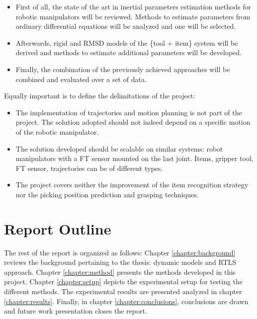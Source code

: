 \documentclass[/home/francois/latex/report/main.tex]{subfiles}
\begin{document}
\begin{itemize}
    \item First of all, the state of the art in inertial parameters estimation methods for robotic manipulators will be reviewed. Methods to estimate parameters from ordinary differential equations will be analyzed and one will be selected.
    \item Afterwards, rigid and \ac{RMSD} models of the \{tool + item\} system will be derived and methods to estimate additional parameters will be developed.
    \item Finally, the combination of the previously achieved approaches will be combined and evaluated over a set of data.
\end{itemize}

Equally important is to define the delimitations of the project:

\begin{itemize}
    \item The implementation of trajectories and motion planning is not part of the project. The solution adopted should not indeed depend on a specific motion of the robotic manipulator.
    \item The solution developed should be scalable on similar systems: robot manipulators with a \ac{FT} sensor mounted on the last joint. Items, gripper tool, \ac{FT} sensor, trajectories can be of different types.
    \item The project covers neither the improvement of the item recognition strategy nor the picking position prediction and grasping techniques.
\end{itemize}


\section{Report Outline}

The rest of the report is organized as follows: Chapter \ref{chapter:background} reviews the background pertaining to the thesis: dynamic models and \ac{RTLS} approach. Chapter \ref{chapter:method} presents the methods developed in this project. Chapter \ref{chapter:setup} depicts the experimental setup for testing the different methods. The experimental results are presented analyzed in chapter \ref{chapter:results}. Finally, in chapter \ref{chapter:conclusions}, conclusions are drawn and future work presentation closes the report.
\end{document}

